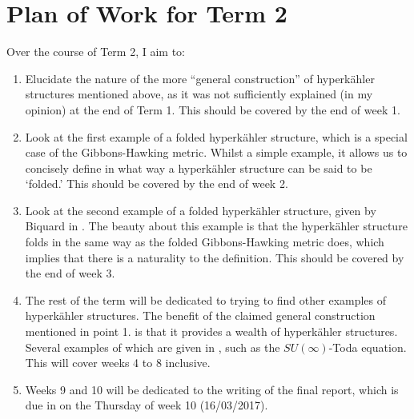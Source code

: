 \documentclass[a4paper,onecolumn,12pt]{article}
\theoremstyle{definition}
\theoremstyle{remark}
\newcommand{\HK}{hyperk\"ahler }
\begin{document}
\section{Plan of Work for Term 2}
Over the course of Term 2, I aim to:
\begin{enumerate}
	\item Elucidate the nature of the more ``general construction'' of \HK structures mentioned above, as it was not sufficiently explained (in my opinion) at the end of Term 1. This should be covered by the end of week 1.
	\item Look at the first example of a folded \HK structure, which is a special case of the Gibbons-Hawking metric. Whilst a simple example, it allows us to concisely define in what way a \HK structure can be said to be `folded.' This should be covered by the end of week 2.
	\item Look at the second example of a folded \HK structure, given by Biquard in \cite{biquard_2015}. The beauty about this example is that the \HK structure folds in the same way as the folded Gibbons-Hawking metric does, which implies that there is a naturality to the definition. This should be covered by the end of week 3.
	\item The rest of the term will be dedicated to trying to find other examples of \HK structures. The benefit of the claimed general construction mentioned in point 1. is that it provides a wealth of \HK structures. Several examples of which are given in \cite{hashimoto_1997}, such as the $SU(\infty)$-Toda equation. This will cover weeks 4 to 8 inclusive.
	\item Weeks 9 and 10 will be dedicated to the writing of the final report, which is due in on the Thursday of week 10 (16/03/2017).
\end{enumerate}

 

\end{document}
